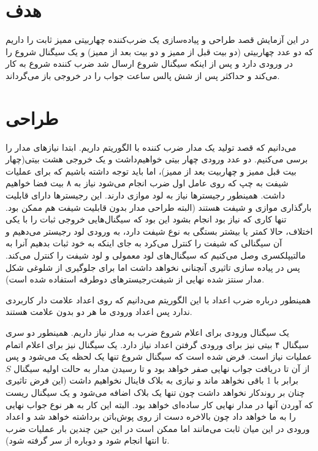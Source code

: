 \documentclass{article}
\begin{document}
\section{هدف}
در این آزمایش قصد طراحی و پیاده‌سازی یک ضرب‌کننده چهاربیتی ممیز ثابت را داریم که دو عدد چهاربیتی (دو بیت قبل از ممیز و دو بیت بعد از ممیز) و یک سیگنال شروع را در ورودی دارد و پس از اینکه سیگنال شروع ارسال شد ضرب کننده شروع به کار می‌کند و حداکثر پس از شش پالس ساعت جواب را در خروجی باز می‌گرداند.

\section{طراحی}
می‌دانیم که قصد تولید یک مدار ضرب کننده با الگوریتم  داریم. ابتدا نیازهای مدار را برسی می‌کنیم. دو عدد ورودی چهار بیتی خواهیم‌داشت و یک خروجی هشت بیتی(چهار بیت قبل ممیز و چهاربیت بعد از ممیز)، اما باید توجه داشته باشیم که برای عملیات‌ شیفت به چپ که روی عامل اول ضرب انجام می‌شود نیاز به ۸ بیت فضا خواهیم داشت. همینطور رجیسترها نیاز به لود موازی دارند. این رجیسترها دارای قابلیت بارگذاری موازی و شیفت هستند (البته طراحی مدار بدون قابلیت شیفت هم ممکن بود. تنها کاری که نیاز بود انجام بشود این بود که سیگنال‌هایی خروجی ثبات را با یکی اختلاف، حالا کمتر یا بیشتر بستگی به نوع شیفت دارد، به ورودی لود رجیستر می‌دهیم و آن سیگنالی که شیفت را کنترل می‌کرد به جای اینکه به خود ثبات بدهیم آنرا به مالتیپلکسری وصل می‌کنیم که سیگنال‌های لود معمولی و لود شیفت را کنترل می‌کند. پس در پیاده سازی تاثیری آنچنانی نخواهد داشت اما برای جلوگیری از شلوغی شکل مدار سنتز شده نهایی از شیفت‌رجیسترهای دوطرفه استفاده شده است).

همینطور درباره ضرب اعداد با این الگوریتم می‌دانیم که روی اعداد علامت دار کاربردی ندارد پس اعداد ورودی ما هر دو بدون علامت هستند.

یک سیگنال ورودی برای اعلام شروع ضرب به مدار نیاز داریم. همینطور دو سری سیگنال ۴ بیتی نیز برای ورودی گرفتن اعداد نیاز دارد. یک سیگنال نیز برای اعلام اتمام عملیات نیاز است.
فرض شده است که سیگنال شروع تنها یک لحظه یک می‌شود و پس از آن تا دریافت جواب نهایی صفر خواهد بود و تا رسیدن مدار به حالت اولیه سیگنال $S$ برابر با 1 باقی نخواهد ماند و نیازی به بلاک فاینال نخواهیم داشت (این فرض تاثیری چنان بر روندکار نخواهد داشت چون تنها یک بلاک اضافه می‌شود و یک سیگنال ریست که آوردن آنها در مدار نهایی کار ساده‌ای خواهد بود. البته این کار به هر نوع جواب نهایی را به ما خواهد داد چون بالاخره دست از روی پوش‌باتن برداشته خواهد شد و اعداد ورودی در این میان ثابت می‌مانند اما ممکن است در این حین چندین بار عملیات ضرب تا انتها انجام شود و دوباره از سر گرفته شود).
\end{document}
